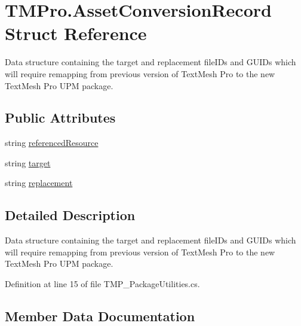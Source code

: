 \hypertarget{struct_t_m_pro_1_1_asset_conversion_record}{}\section{T\+M\+Pro.\+Asset\+Conversion\+Record Struct Reference}
\label{struct_t_m_pro_1_1_asset_conversion_record}


Data structure containing the target and replacement file\+I\+Ds and G\+U\+I\+Ds which will require remapping from previous version of Text\+Mesh Pro to the new Text\+Mesh Pro U\+PM package.  


\subsection*{Public Attributes}
\begin{DoxyCompactItemize}
\item 
string \mbox{\hyperlink{struct_t_m_pro_1_1_asset_conversion_record_a162b46d5a4ab24deb0ebd538d16bc4f2}{referenced\+Resource}}
\item 
string \mbox{\hyperlink{struct_t_m_pro_1_1_asset_conversion_record_a406640440ce56962696b39a605cc80a6}{target}}
\item 
string \mbox{\hyperlink{struct_t_m_pro_1_1_asset_conversion_record_a7217cf55ce06161e09a6bb6fa78714b0}{replacement}}
\end{DoxyCompactItemize}


\subsection{Detailed Description}
Data structure containing the target and replacement file\+I\+Ds and G\+U\+I\+Ds which will require remapping from previous version of Text\+Mesh Pro to the new Text\+Mesh Pro U\+PM package. 



Definition at line 15 of file T\+M\+P\+\_\+\+Package\+Utilities.\+cs.



\subsection{Member Data Documentation}
\mbox{\label{struct_t_m_pro_1_1_asset_conversion_record_a162b46d5a4ab24deb0ebd538d16bc4f2}} 
